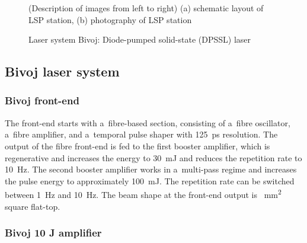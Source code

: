 \begin{figure}[H]
\begin{center}
  \hspace{1cm}
  \caption[Schematic layout of LSP station and photography of LSP station]
    {(Description of images from left to right) (a) schematic layout of LSP station, (b) photography of LSP station~\cite{bohm_kaufman_brajer_rostohar_2019}}
  \label{fig:lsplayout}
\end{center}
\end{figure}

 \begin{figure}[h]
    \centering
    \noindent{}
    \caption[Laser system Bivoj: Diode-pumped solid-state (DPSSL) laser]{Laser system Bivoj: Diode-pumped solid-state (DPSSL) laser \protect\cite{bivojiso}}
    \label{fig:bivoj}
\end{figure}

\subsection{Bivoj laser system}

\subsubsection*{Bivoj front-end}

The front-end starts with a~fibre-based section, consisting
of a~fibre oscillator, a~fibre amplifier, and a~temporal pulse shaper
with \SI{125}{\ps} resolution. The output of the fibre front-end is fed
to the first booster amplifier, which is regenerative and
increases the energy to \SI{30}{\milli\joule} and reduces the repetition rate to \SI{10}{\hertz}. The second booster amplifier works in a~multi-pass regime
and increases the pulse energy to approximately \SI{100}{\milli\joule}.
The repetition rate can be switched between \SI{1}{\hertz} and \SI{10}{\hertz}. The 
beam shape at the front-end output is  \SI{}{\mm\squared} square flat-top.



\subsubsection*{Bivoj 10 J amplifier}

